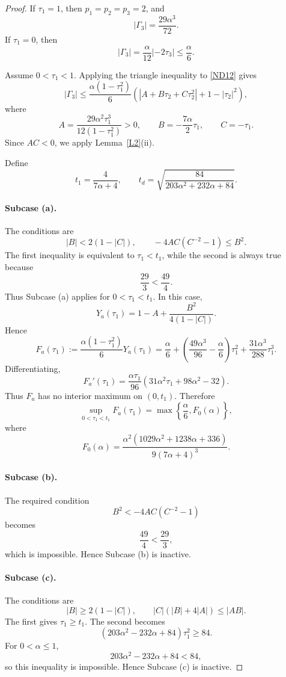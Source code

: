 \documentclass[11pt,reqno]{amsart}
\numberwithin{equation}{section}
\begin{document}
\begin{proof}
If $\tau_1=1$, then $p_1=p_2=p_3=2$, and
\[
|\Gamma_3|=\frac{29\alpha^3}{72}.
\]
If $\tau_1=0$, then
\[
|\Gamma_3|=\frac{\alpha}{12}|-2\tau_3|
\le \frac{\alpha}{6}.
\]

Assume $0<\tau_1<1$. Applying the triangle inequality to \eqref{ND12} gives
\begin{equation}\label{ND13}
|\Gamma_3|
\le
\frac{\alpha(1-\tau_1^2)}{6}
\left(
|A+B\tau_2+C\tau_2^2|+1-|\tau_2|^2
\right),
\end{equation}
where
\[
A=\frac{29\alpha^2\tau_1^3}{12(1-\tau_1^2)}>0,
\qquad
B=-\frac{7\alpha}{2}\tau_1,
\qquad
C=-\tau_1.
\]
Since $AC<0$, we apply Lemma~\ref{L2}(ii).

Define
\[
t_1=\frac{4}{7\alpha+4},
\qquad
t_d=\sqrt{\frac{84}{203\alpha^2+232\alpha+84}}.
\]

\paragraph{Subcase (a).}
The conditions are
\[
|B|<2(1-|C|),\qquad -4AC(C^{-2}-1)\le B^2.
\]
The first inequality is equivalent to $\tau_1<t_1$, while the second is always true because
\[
\frac{29}{3}<\frac{49}{4}.
\]
Thus Subcase (a) applies for $0<\tau_1<t_1$. In this case,
\[
Y_a(\tau_1)
=
1-A+\frac{B^2}{4(1-|C|)}.
\]
Hence
\[
F_a(\tau_1)
:=
\frac{\alpha(1-\tau_1^2)}{6}Y_a(\tau_1)
=
\frac{\alpha}{6}
+
\left(\frac{49\alpha^3}{96}-\frac{\alpha}{6}\right)\tau_1^2
+
\frac{31\alpha^3}{288}\tau_1^3.
\]
Differentiating,
\[
F_a'(\tau_1)
=
\frac{\alpha\tau_1}{96}
\left(
31\alpha^2\tau_1+98\alpha^2-32
\right).
\]
Thus $F_a$ has no interior maximum on $(0,t_1)$. Therefore
\[
\sup_{0<\tau_1<t_1} F_a(\tau_1)
=
\max\left\{
\frac{\alpha}{6},
F_0(\alpha)
\right\},
\]
where
\[
F_0(\alpha)
=
\frac{\alpha^2(1029\alpha^2+1238\alpha+336)}
{9(7\alpha+4)^3}.
\]

\paragraph{Subcase (b).}
The required condition
\[
B^2<-4AC(C^{-2}-1)
\]
becomes
\[
\frac{49}{4}<\frac{29}{3},
\]
which is impossible. Hence Subcase (b) is inactive.

\paragraph{Subcase (c).}
The conditions are
\[
|B|\ge 2(1-|C|),\qquad |C|(|B|+4|A|)\le |AB|.
\]
The first gives $\tau_1\ge t_1$. The second becomes
\[
(203\alpha^2-232\alpha+84)\tau_1^2\ge 84.
\]
For $0<\alpha\le1$,
\[
203\alpha^2-232\alpha+84<84,
\]
so this inequality is impossible. Hence Subcase (c) is inactive.


\end{proof}
\end{document}
